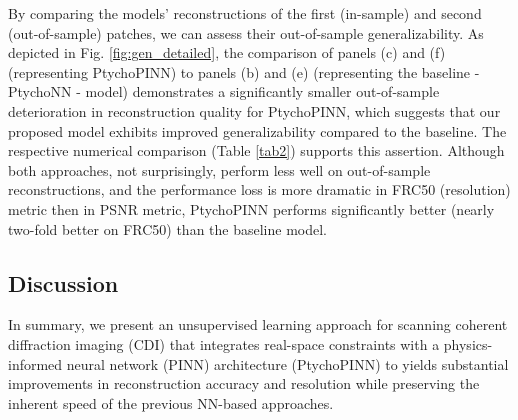 \documentclass[sn-mathphys]{sn-jnl}%
\theoremstyle{thmstyleone}%
\theoremstyle{thmstyletwo}%
\theoremstyle{thmstylethree}%
\begin{document}
By comparing the models' reconstructions of the first (in-sample) and second (out-of-sample) patches, we can assess their out-of-sample generalizability. As depicted in Fig. \ref{fig:gen_detailed}, the comparison of panels (c) and (f) (representing PtychoPINN) to panels (b) and (e) (representing the baseline - PtychoNN - model) demonstrates a significantly smaller out-of-sample deterioration in reconstruction quality for PtychoPINN, which suggests that our proposed model exhibits improved generalizability compared to the baseline. The respective numerical comparison (Table \ref{tab2}) supports this assertion. Although both approaches, not surprisingly, perform less well on out-of-sample reconstructions, and the performance loss is more dramatic in FRC50 (resolution) metric then in PSNR metric, PtychoPINN performs significantly better (nearly two-fold better on FRC50) than the baseline model. 



\subsection{Discussion}
In summary, we present an unsupervised learning approach for scanning coherent diffraction imaging (CDI) that integrates real-space constraints with a physics-informed neural network (PINN) architecture (PtychoPINN) to yields substantial improvements in reconstruction accuracy and resolution while preserving the inherent speed of the previous NN-based approaches. 

\end{document}
